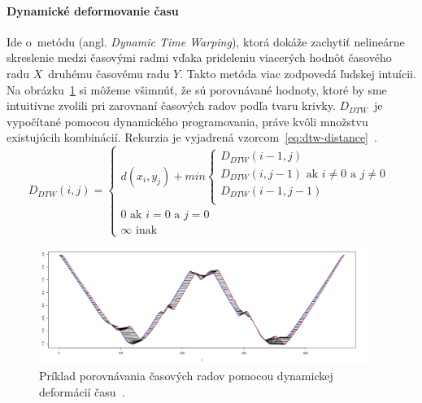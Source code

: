 \documentclass[a4paper,twoside,slovak,12pt,appendix]{article}
\begin{document}
\paragraph{Dynamické deformovanie času}
Ide o~metódu (angl. \textit{Dynamic Time Warping}), ktorá dokáže zachytiť
nelineárne skreslenie medzi časovými radmi vďaka prideleniu viacerých hodnôt
časového radu $X$~druhému časovému radu $Y$. Takto metóda viac zodpovedá ľudskej
intuícii. Na obrázku~\ref{fig:warping-distance} si môžeme všimnúť, že sú
porovnávané hodnoty, ktoré by sme intuitívne zvolili pri zarovnaní časových
radov podľa tvaru krivky. $D_{DTW}$~je vypočítané pomocou dynamického
programovania, práve kvôli množstvu existujúcih kombinácií. Rekurzia je
vyjadrená vzorcom~\ref{eq:dtw-distance}~\cite{Dzeroski2007,Fu2011}.
\begin{equation}
	\label{eq:dtw-distance}
  D_{DTW} \left( i, j \right) =
  \begin{cases}
    d \left( x_i, y_j \right) + min
    \begin{cases}
      D_{DTW} \left( i-1, j \right) \\
      D_{DTW} \left( i, j-1 \right) \text{ ak } i \neq 0 \text{ a } j \neq 0  \\
      D_{DTW} \left( i-1, j-1 \right) \\
    \end{cases} \\
    0 \text{ ak } i = 0 \text{ a } j = 0 \\
    \infty \text{ inak}
  \end{cases}
\end{equation}

\begin{figure}[]
  \centering
  \includegraphics[width=0.95\textwidth]{warping-distance.png}
  \caption{Príklad porovnávania časových radov pomocou dynamickej deformácií času~\cite{Hooper2010}.}
  \label{fig:warping-distance}
\end{figure}

\end{document}
